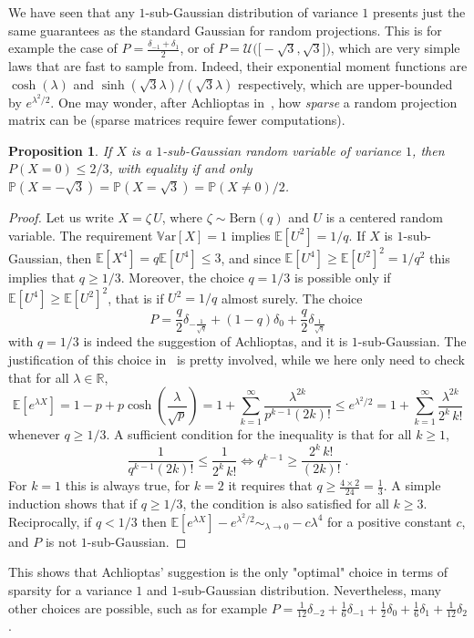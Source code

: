 \documentclass{ps}
\def\R{\mathbb{R}}
\renewcommand{\P}{\mathbb{P}}
\newcommand{\E}{\mathbb{E}}
\newcommand{\Var}{\mathbb{V}\!\mathrm{ar}}
\newcommand{\1}{\mathbbm{1}}
\theoremstyle{plain}
\newtheorem{proposition}{Proposition}
\begin{document}
We have seen that any $1$-sub-Gaussian distribution of variance $1$ presents just the same guarantees as the standard Gaussian for random projections. This is for example the case of $\displaystyle{P = \frac{\delta_{-1}+\delta_1}{2}}$, or of $ P = \mathcal{U}\Big(\big[-\sqrt{3},\sqrt{3}\big]\Big)$, which are very simple laws that are fast to sample from. Indeed, their exponential moment functions are $\cosh(\lambda)$ and $\sinh(\sqrt{3}\lambda)/(\sqrt{3}\lambda)$ respectively, which are upper-bounded by $e^{\lambda^2/2}$.
%
One may wonder, after Achlioptas in~\cite{Achlioptas01}, how \emph{sparse} a random projection matrix can be (sparse matrices require fewer computations). 
\begin{proposition}\label{prop:ArchiBest}
    If $X$ is a $1$-sub-Gaussian random variable of variance $1$, then $P(X=0)\leq 2/3$, with equality if and only $\P(X=-\sqrt{3}) = \P(X=\sqrt{3}) = \P(X\neq 0)/2$.
\end{proposition}
\begin{proof}
Let us write $X = \zeta \,U$, where $\zeta\sim\mathrm{Bern}(q)$ and $U$ is a centered random variable. The requirement $\Var[X] = 1$ implies $\E[U^2] = 1/q$. 
If $X$ is $1$-sub-Gaussian, then $\E[X^4] = q \E[U^4] \leq 3$, and since $\E[U^4]\geq \E[U^2]^2 = 1/q^2$ this implies that $q\geq 1/3$. Moreover, the choice $q=1/3$ is possible only if $\E[U^4]\geq \E[U^2]^2$, that is if $U^2 = 1/q$ almost surely. 
The choice 
\begin{equation}\label{eq:def_distribution}
	P = \frac{q}{2}\delta_{-\frac{1}{\sqrt{q}}} + (1-q)\delta_0 + \frac{q}{2}\delta_{\frac{1}{\sqrt{q}}}
\end{equation} 
with $q=1/3$ is indeed the suggestion of Achlioptas, and it is 
$1$-sub-Gaussian. The justification of this choice in~\cite{Achlioptas01} is pretty involved, while we here only need to check that for all $\lambda\in\R$, 
\[\E[e^{\lambda X}] = 1-p + p \cosh\left(\frac{\lambda}{\sqrt{p}}\right) = 1 + \sum_{k=1}^\infty \frac{\lambda^{2k}}{p^{k-1}(2k)!} \leq  e^{\lambda^2/2} = 1 + \sum_{k=1}^\infty \frac{\lambda^{2k}}{2^k\, k!}\]
whenever $q\geq 1/3$.
A sufficient condition for the inequality is that for all $k\geq 1$, 
\begin{equation}\label{eq:condition_subgaussian}
	\frac{1}{q^{k-1}(2k)!} \leq \frac{1}{2^k \,k!} \iff q^{k-1}\geq \frac{2^k\,k!}{(2k)!} \;.
\end{equation}
For $k=1$ this is always true, for $k=2$ it requires that $\displaystyle{q \geq \frac{4\times 2}{24} =\frac{1}{3}}$. A simple induction shows that if $q\geq 1/3$, the condition is also satisfied for all $k\geq 3$. 
Reciprocally, if $q<1/3$ then $\displaystyle{\E[e^{\lambda X}] -  e^{\lambda^2/2}  \sim_{\lambda\to 0}  -c \lambda^4}$ for a positive constant $c$, and $P$ is not $1$-sub-Gaussian. 
\end{proof}
This shows that Achlioptas' suggestion is the only "optimal" choice in terms of sparsity for a variance $1$ and $1$-sub-Gaussian distribution.
Nevertheless, many other choices are possible, such as for example $P = \frac{1}{12}\delta_{-2} +\frac{1}{6}\delta_{-1}+  \frac{1}{2}\delta_0 + \frac{1}{6}\delta_{1} + \frac{1}{12}\delta_{2}$.
\end{document}
